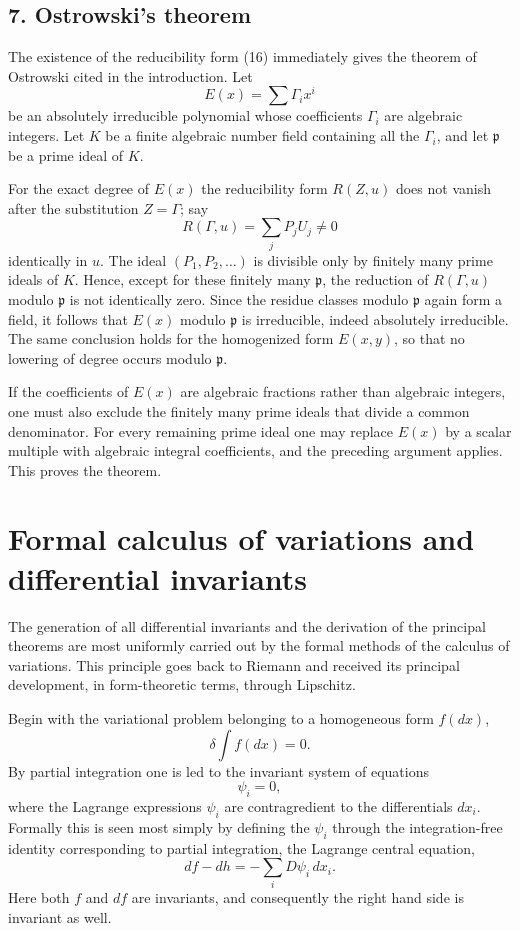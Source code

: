 \documentclass[11pt]{article}
\begin{document}
\subsection*{7. Ostrowski's theorem}

The existence of the reducibility form (16) immediately gives the theorem of Ostrowski cited in the introduction. Let
\[
  E(x)=\sum \Gamma_i x^i
\]
be an absolutely irreducible polynomial whose coefficients $\Gamma_i$ are algebraic integers. Let $K$ be a finite algebraic number field containing all the $\Gamma_i$, and let $\mathfrak p$ be a prime ideal of $K$.

For the exact degree of $E(x)$ the reducibility form $R(Z,u)$ does not vanish after the substitution $Z=\Gamma$; say
\[
  R(\Gamma,u)=\sum_j P_j U_j\ne 0
\]
identically in $u$. The ideal $(P_1,P_2,\ldots)$ is divisible only by finitely many prime ideals of $K$. Hence, except for these finitely many $\mathfrak p$, the reduction of $R(\Gamma,u)$ modulo $\mathfrak p$ is not identically zero. Since the residue classes modulo $\mathfrak p$ again form a field, it follows that $E(x)$ modulo $\mathfrak p$ is irreducible, indeed absolutely irreducible. The same conclusion holds for the homogenized form $E(x,y)$, so that no lowering of degree occurs modulo $\mathfrak p$.

If the coefficients of $E(x)$ are algebraic fractions rather than algebraic integers, one must also exclude the finitely many prime ideals that divide a common denominator. For every remaining prime ideal one may replace $E(x)$ by a scalar multiple with algebraic integral coefficients, and the preceding argument applies. This proves the theorem.

\newpage

\section{Formal calculus of variations and differential invariants}

The generation of all differential invariants and the derivation of the principal theorems are most uniformly carried out by the formal methods of the calculus of variations. This principle goes back to Riemann and received its principal development, in form-theoretic terms, through Lipschitz.

Begin with the variational problem belonging to a homogeneous form $f(dx)$,
\begin{equation}
  \delta \int f(dx)=0.                                            \tag{140}
\end{equation}
By partial integration one is led to the invariant system of equations
\[
  \psi_i=0,
\]
where the Lagrange expressions $\psi_i$ are contragredient to the differentials $dx_i$. Formally this is seen most simply by defining the $\psi_i$ through the integration-free identity corresponding to partial integration, the Lagrange central equation,
\[
  df-dh=-\sum_i D\psi_i\,dx_i.
\]
Here both $f$ and $df$ are invariants, and consequently the right hand side is invariant as well.
\end{document}
